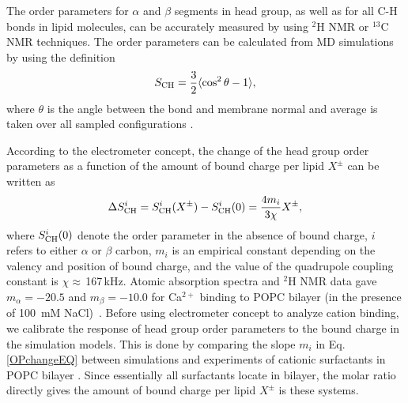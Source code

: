 \documentclass[aip,jcp,twocolumn]{revtex4}
\begin{document}
The order parameters for $\alpha$ and $\beta$ segments in head group, as well as for
all C-H bonds in lipid molecules,
can be accurately measured by using $^2$H NMR or $^{13}$C NMR techniques.
The order parameters can be calculated from MD simulations 
by using the definition
\begin{equation}\label{OP}
S_{\rm CH}=\frac{3}{2}\langle \cos^2\theta -1 \rangle,
\end{equation}
where $\theta$ is the angle between the bond and membrane
normal and average is taken over all sampled configurations \cite{ollila16}.

According to the electrometer concept,
the change of the head group order parameters as a function of
the amount of bound charge per lipid $X^\pm$ 
can be written as~\cite{ferreira16}
\begin{equation}\label{OPchangeEQ}
\Delta S_{\rm{CH}}^{i}= S_{\rm{CH}}^{i}(X^\pm)-S_{\rm{CH}}^{i}(0) =\frac{4m_i }{3\chi}X^\pm,
\end{equation}
where $S_{\rm{CH}}^{i}(0)$ denote the order parameter in the absence of bound charge,
$i$ refers to either $\alpha$ or $\beta$ carbon,
$m_i$ is an empirical constant depending on the valency and position of bound charge,
and the value of the quadrupole coupling constant is $\chi \approx$\,167\,kHz.
Atomic absorption spectra and $^2$H NMR data gave
$m_\alpha=-20.5$  and $m_\beta=-10.0$ for Ca$^{2+}$ binding to POPC
bilayer (in the presence of 100~mM NaCl)~\cite{altenbach84,ollila16,catte16}.
Before using electrometer concept to analyze cation binding, 
we calibrate the response of head group order parameters to the bound
charge in the simulation models. This is done by comparing 
the slope $m_i$ in Eq. \ref{OPchangeEQ} between simulations and
experiments of cationic surfactants in POPC bilayer \cite{scherer89}. 
Since essentially all surfactants locate in bilayer, the 
molar ratio directly gives the amount of bound charge per 
lipid $X^\pm$ is these systems.
\end{document}
